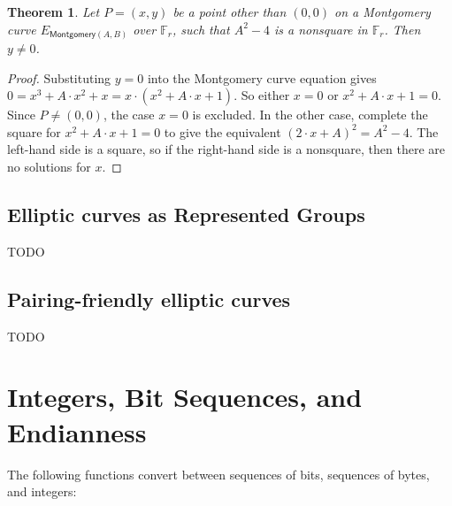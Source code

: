 \documentclass{article}
\newtheorem{theorem}{Theorem}[subsection]
\newcommand{\Field}[1]{\mathbb{F}_{\!#1}}
\newcommand{\mult}{\cdot}
\newcommand{\Montgomery}[1]{E_{\mathsf{Montgomery}({#1})}}
\begin{document}
\begin{theorem}
Let $P = (x, y)$ be a point other than $(0, 0)$ on a Montgomery curve $\Montgomery{A,B}$
over $\Field{r}$, such that $A^2 - 4$ is a nonsquare in $\Field{r}$.
Then $y \neq 0$.
\end{theorem}

\begin{proof}
Substituting $y = 0$ into the Montgomery curve equation gives
$0 = x^3 + A \mult x^2 + x = x \mult (x^2 + A \mult x + 1)$.
So either $x = 0$ or $x^2 + A \mult x + 1 = 0$.
Since $P \neq (0, 0)$, the case $x = 0$ is excluded.
In the other case, complete the square for $x^2 + A \mult x + 1 = 0$
to give the equivalent $(2 \mult x + A)^2 = A^2 - 4$.
The left-hand side is a square, so if the right-hand side is a nonsquare,
then there are no solutions for $x$.
\end{proof}


\subsection{Elliptic curves as Represented Groups} \label{ecgroup}

TODO

\subsection{Pairing-friendly elliptic curves} \label{ecpairing}

TODO


\section{Integers, Bit Sequences, and Endianness} \label{endian}

The following functions convert between sequences of bits, sequences of bytes,
and integers:
\end{document}
